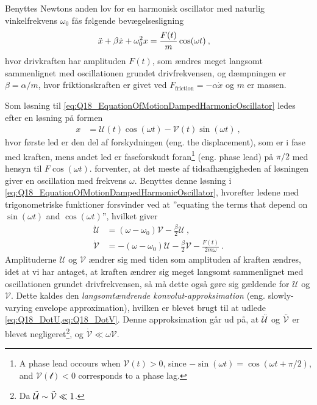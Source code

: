 Benyttes Newtons anden lov for en harmonisk oscillator med naturlig vinkelfrekvens $\omega_0$ fås følgende bevægelsesligning
\begin{align} \label{eq:Q18_EquationOfMotionDampedHarmonicOscillator}
    \Ddot{x} + \beta \Dot{x} + \omega_0^2 x &= \frac{F(t)}{m}\cos(\omega t) \: ,
\end{align}
hvor drivkraften har amplituden $F(t)$, som ændres meget langsomt sammenlignet med oscillationen grundet drivfrekvensen, og dæmpningen er $\beta = \alpha/m$, hvor friktionskraften er givet ved $F_\text{friction} = -\alpha\Dot{x}$ og $m$ er massen.

Som løsning til \cref{eq:Q18_EquationOfMotionDampedHarmonicOscillator} ledes efter en løsning på formen
\begin{align} \label{eq:Q18_FormOfTheSolution}
    x &= \mathcal{U}(t)\cos(\omega t) - \mathcal{V}(t)\sin(\omega t) \: ,
\end{align}
hvor første led er den del af forskydningen (eng. the displacement), som er i fase med kraften, mens andet led er faseforskudt foran\footnote{A phase lead occours when $\mathcal{V}(t) > 0$, since $-\sin(\omega t) = \cos(\omega t + \pi/2)$, and $\mathcal{V(t) < 0}$ corresponds to a phase lag.} (eng. phase lead) på $\pi/2$ med hensyn til $F\cos(\omega t)$.  forventer, at det meste af tidsafhængigheden af løsningen giver en oscillation med frekvens $\omega$. Benyttes denne løsning i \cref{eq:Q18_EquationOfMotionDampedHarmonicOscillator}, hvorefter ledene med trigonometriske funktioner forsvinder ved at ''equating the terms that depend on $\sin(\omega t)$ and $\cos(\omega t)$'', hvilket giver
\begin{align}
    \Dot{\mathcal{U}} &= (\omega - \omega_0)\mathcal{V} - \frac{\beta}{2}\mathcal{U} \: , \label{eq:Q18_DotU} \\
    \Dot{\mathcal{V}} &= -(\omega - \omega_0)\mathcal{U} - \frac{\beta}{2}\mathcal{V} - \frac{F(t)}{2m\omega} \: . \label{eq:Q18_DotV}
\end{align}
Amplituderne $\mathcal{U}$ og $\mathcal{V}$ ændrer sig med tiden som amplituden af kraften ændres, idet at vi har antaget, at kraften ændrer sig meget langsomt sammenlignet med oscillationen grundet drivfrekvensen, så må dette også gøre sig gældende for $\mathcal{U}$ og $\mathcal{V}$. Dette kaldes den \emph{langsomtændrende konvolut-approksimation} (eng. slowly-varying envelope approximation), hvilken er blevet brugt til at udlede \cref{eq:Q18_DotU,eq:Q18_DotV}. Denne approksimation går ud på, at $\Ddot{\mathcal{U}}$ og $\Ddot{\mathcal{V}}$ er blevet negligeret\footnote{Da $\Ddot{\mathcal{U}} \sim \Ddot{\mathcal{V}} \ll 1$.}, og $\Dot{\mathcal{V}} \ll \omega \mathcal{V}$.

